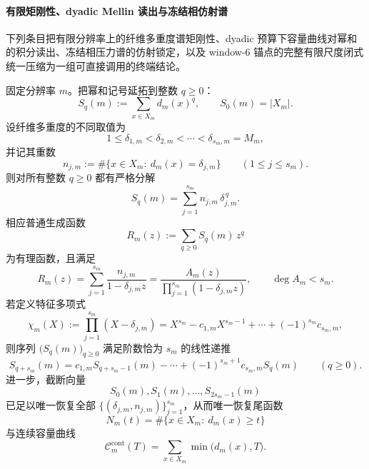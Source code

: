 \paragraph{有限矩刚性、dyadic Mellin 读出与冻结相仿射谱}
下列条目把有限分辨率上的纤维多重度谱矩刚性、dyadic 预算下容量曲线对幂和的积分读出、冻结相压力谱的仿射锁定，以及 window-\(6\) 锚点的完整有限尺度闭式统一压缩为一组可直接调用的终端结论。

\begin{theorem}\label{thm:xi-fiber-spectrum-finite-moment-rigidity}
固定分辨率 \(m\)。把幂和记号延拓到整数 \(q\ge 0\)：
\[
S_q(m):=\sum_{x\in X_m}d_m(x)^q,
\qquad
S_0(m)=|X_m|.
\]
设纤维多重度的不同取值为
\[
1\le \delta_{1,m}<\delta_{2,m}<\cdots<\delta_{s_m,m}=M_m,
\]
并记其重数
\[
n_{j,m}:=\#\{x\in X_m:\ d_m(x)=\delta_{j,m}\}
\qquad(1\le j\le s_m).
\]
则对所有整数 \(q\ge 0\) 都有严格分解
\[
\boxed{\;
S_q(m)=\sum_{j=1}^{s_m}n_{j,m}\,\delta_{j,m}^{\,q}.\;}
\]
相应普通生成函数
\[
R_m(z):=\sum_{q\ge 0}S_q(m)\,z^q
\]
为有理函数，且满足
\[
\boxed{\;
R_m(z)=\sum_{j=1}^{s_m}\frac{n_{j,m}}{1-\delta_{j,m}z}
=
\frac{A_m(z)}{\prod_{j=1}^{s_m}(1-\delta_{j,m}z)},\qquad
\deg A_m<s_m.\;}
\]
若定义特征多项式
\[
\chi_m(X):=\prod_{j=1}^{s_m}(X-\delta_{j,m})
=
X^{s_m}-c_{1,m}X^{s_m-1}+\cdots+(-1)^{s_m}c_{s_m,m},
\]
则序列 \(\bigl(S_q(m)\bigr)_{q\ge 0}\) 满足阶数恰为 \(s_m\) 的线性递推
\[
\boxed{\;
S_{q+s_m}(m)
=
c_{1,m}S_{q+s_m-1}(m)-\cdots+(-1)^{s_m+1}c_{s_m,m}S_q(m)
\qquad(q\ge 0).\;}
\]
进一步，截断向量
\[
S_0(m),S_1(m),\dots,S_{2s_m-1}(m)
\]
已足以唯一恢复全部 \(\{(\delta_{j,m},n_{j,m})\}_{j=1}^{s_m}\)，从而唯一恢复尾函数
\[
N_m(t)=\#\{x\in X_m:\ d_m(x)\ge t\}
\]
与连续容量曲线
\[
\mathcal C_m^{\mathrm{cont}}(T)=\sum_{x\in X_m}\min\bigl(d_m(x),T\bigr).
\]
\end{theorem}
